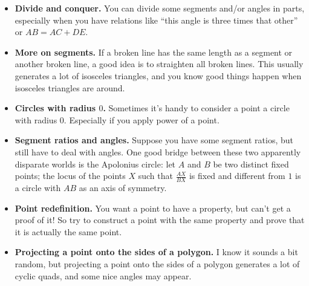 \documentclass[10pt]{article}
\theoremstyle{definition}
\theoremstyle{remark}
\begin{document}
\begin{itemize}
\item \textbf{Divide and conquer.} You can divide some segments and/or angles in parts, especially when you have relations like ``this angle is three times that other'' or $AB = AC + DE$.
\item \textbf{More on segments.} If a broken line has the same length as a segment or another broken line, a good idea is to straighten all broken lines. This usually generates a lot of isosceles triangles, and you know good things happen when isosceles triangles are around.
\item \textbf{Circles with radius $0$.} Sometimes it's handy to consider a point a circle with radius $0$. Especially if you apply power of a point.
\item \textbf{Segment ratios and angles.} Suppose you have some segment ratios, but still have to deal with angles. One good bridge between these two apparently disparate worlds is the Apolonius circle: let $A$ and $B$ be two distinct fixed points; the locus of the points $X$ such that $\frac{AX}{BX}$ is fixed and different from $1$ is a circle with $AB$ as an axis of symmetry.
\item \textbf{Point redefinition.} You want a point to have a property, but can't get a proof of it! So try to construct a point with the same property and prove that it is actually the same point.
\item \textbf{Projecting a point onto the sides of a polygon.} I know it sounds a bit random, but projecting a point onto the sides of a polygon generates a lot of cyclic quads, and some nice angles may appear.
\end{itemize}
\end{document}
